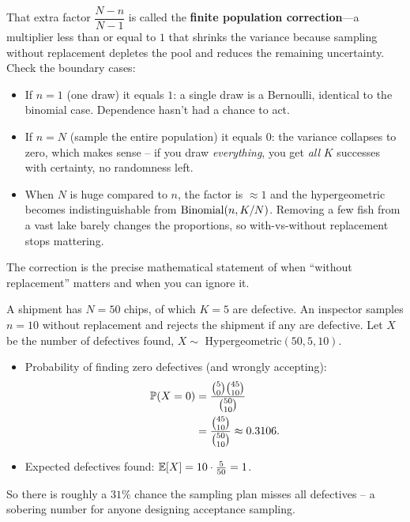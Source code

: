 \begin{happeningbox}
That extra factor $\dfrac{N-n}{N-1}$ is called the \textbf{finite population
correction}---a multiplier less than or equal to $1$ that shrinks the variance
because sampling without replacement depletes the pool and reduces the remaining
uncertainty. Check the boundary cases:
\begin{itemize}
\item If $n = 1$ (one draw) it equals $1$: a single draw is a Bernoulli,
  identical to the binomial case. Dependence hasn't had a chance to act.
\item If $n = N$ (sample the entire population) it equals $0$: the variance
  collapses to zero, which makes sense -- if you draw \emph{everything}, you
  get \emph{all} $K$ successes with certainty, no randomness left.
\item When $N$ is huge compared to $n$, the factor is $\approx 1$ and the
  hypergeometric becomes indistinguishable from $\Bin(n, K/N)$. Removing a few
  fish from a vast lake barely changes the proportions, so with-vs-without
  replacement stops mattering.
\end{itemize}
The correction is the precise mathematical statement of when ``without
replacement'' matters and when you can ignore it.
\end{happeningbox}

\begin{example}
\label{ch07:ex-qc}
A shipment has $N = 50$ chips, of which $K = 5$ are defective. An inspector samples
$n = 10$ without replacement and rejects the shipment if any are defective. Let
$X$ be the number of defectives found, $X \sim$ Hypergeometric$(50, 5, 10)$.
\begin{itemize}
\item Probability of finding zero defectives (and wrongly accepting):
  \begin{align*}
    \P(X = 0) &= \frac{\binom{5}{0}\binom{45}{10}}{\binom{50}{10}} \\
    &= \frac{\binom{45}{10}}{\binom{50}{10}} \approx 0.3106.
  \end{align*}
\item Expected defectives found: $\E[X] = 10 \cdot \tfrac{5}{50} = 1$.
\end{itemize}
So there is roughly a $31\%$ chance the sampling plan misses all defectives -- a
sobering number for anyone designing acceptance sampling.
\end{example}

